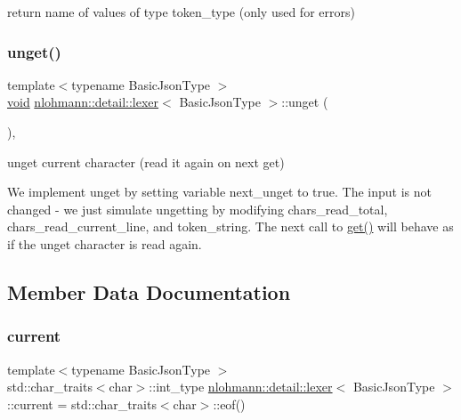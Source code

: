 return name of values of type token\+\_\+type (only used for errors) 

\mbox{\label{classnlohmann_1_1detail_1_1lexer_a626f145768762057dc68a4666eb577db}} 
\subsubsection{\texorpdfstring{unget()}{unget()}}
{\footnotesize\ttfamily template$<$typename Basic\+Json\+Type $>$ \\
\hyperlink{namespacenlohmann_1_1detail_a59fca69799f6b9e366710cb9043aa77d}{void} \hyperlink{classnlohmann_1_1detail_1_1lexer}{nlohmann\+::detail\+::lexer}$<$ Basic\+Json\+Type $>$\+::unget (\begin{DoxyParamCaption}{ }\end{DoxyParamCaption})\hspace{0.3cm}{\ttfamily [inline]}, {\ttfamily [private]}}



unget current character (read it again on next get) 

We implement unget by setting variable next\+\_\+unget to true. The input is not changed -\/ we just simulate ungetting by modifying chars\+\_\+read\+\_\+total, chars\+\_\+read\+\_\+current\+\_\+line, and token\+\_\+string. The next call to \hyperlink{classnlohmann_1_1detail_1_1lexer_a901e45a34e1fb1d97ab62350b0c3ef26}{get()} will behave as if the unget character is read again. 

\subsection{Member Data Documentation}
\mbox{\label{classnlohmann_1_1detail_1_1lexer_a47169f9aaf0da4c9885e61d3109859aa}} 
\subsubsection{\texorpdfstring{current}{current}}
{\footnotesize\ttfamily template$<$typename Basic\+Json\+Type $>$ \\
std\+::char\+\_\+traits$<$char$>$\+::int\+\_\+type \hyperlink{classnlohmann_1_1detail_1_1lexer}{nlohmann\+::detail\+::lexer}$<$ Basic\+Json\+Type $>$\+::current = std\+::char\+\_\+traits$<$char$>$\+::eof()\hspace{0.3cm}{\ttfamily [private]}}



